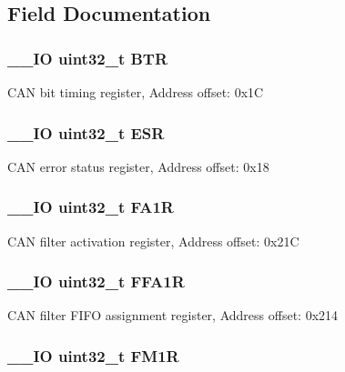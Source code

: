 \subsection{Field Documentation}
\hypertarget{struct_c_a_n___type_def_a5c0fcd3e7b4c59ab1dd68f6bd8f74e07}{
\subsubsection[{B\-T\-R}]{\setlength{\rightskip}{0pt plus 5cm}\-\_\-\-\_\-\-I\-O uint32\-\_\-t B\-T\-R}}\label{struct_c_a_n___type_def_a5c0fcd3e7b4c59ab1dd68f6bd8f74e07}
C\-A\-N bit timing register, Address offset\-: 0x1\-C \hypertarget{struct_c_a_n___type_def_a2b39f943954e0e7d177b511d9074a0b7}{
\subsubsection[{E\-S\-R}]{\setlength{\rightskip}{0pt plus 5cm}\-\_\-\-\_\-\-I\-O uint32\-\_\-t E\-S\-R}}\label{struct_c_a_n___type_def_a2b39f943954e0e7d177b511d9074a0b7}
C\-A\-N error status register, Address offset\-: 0x18 \hypertarget{struct_c_a_n___type_def_aaf76271f4ab0b3deb3ceb6e2ac0d62d0}{
\subsubsection[{F\-A1\-R}]{\setlength{\rightskip}{0pt plus 5cm}\-\_\-\-\_\-\-I\-O uint32\-\_\-t F\-A1\-R}}\label{struct_c_a_n___type_def_aaf76271f4ab0b3deb3ceb6e2ac0d62d0}
C\-A\-N filter activation register, Address offset\-: 0x21\-C \hypertarget{struct_c_a_n___type_def_af1405e594e39e5b34f9499f680157a25}{
\subsubsection[{F\-F\-A1\-R}]{\setlength{\rightskip}{0pt plus 5cm}\-\_\-\-\_\-\-I\-O uint32\-\_\-t F\-F\-A1\-R}}\label{struct_c_a_n___type_def_af1405e594e39e5b34f9499f680157a25}
C\-A\-N filter F\-I\-F\-O assignment register, Address offset\-: 0x214 \hypertarget{struct_c_a_n___type_def_aaa6f4cf1f16aaa6d17ec6c410db76acf}{
\subsubsection[{F\-M1\-R}]{\setlength{\rightskip}{0pt plus 5cm}\-\_\-\-\_\-\-I\-O uint32\-\_\-t F\-M1\-R}}\label{struct_c_a_n___type_def_aaa6f4cf1f16aaa6d17ec6c410db76acf}
